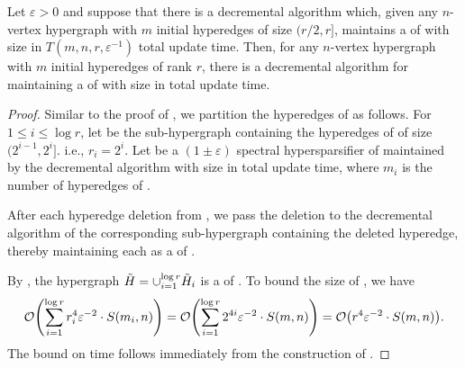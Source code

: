 \begin{lemma} \label{lem:r/2_dynamic}
Let \( \varepsilon > 0 \) and
suppose that there is a decremental algorithm which, given any \( n \)-vertex hypergraph  with \( m \) initial hyperedges of size \( (r/2, r ] \), maintains a \SpectralHypersparsifier{} of  with size  in \( T(m, n, r, \varepsilon ^{-1}) \) total update time.
Then, for any \( n \)-vertex hypergraph  with \( m \) initial hyperedges of rank \( r \), there is a decremental algorithm for maintaining a \SpectralHypersparsifier{} of  with size  in  total update time.
\end{lemma}
\begin{proof}
Similar to the proof of , we partition the hyperedges of  as follows.
For \( 1 \leq i \leq \log r \), let  be the sub-hypergraph containing the hyperedges of  of size \( (2^{i - 1} , 2^i] \).
i.e., \( r_i =  2^i\).
Let 
 be a \( (1 \pm \varepsilon ) \) spectral hypersparsifier of  maintained by the decremental algorithm with size  in  total update time, where \( m_i \) is the number of hyperedges of .

After each hyperedge deletion from , we pass the deletion to the decremental algorithm of the corresponding sub-hypergraph containing the deleted hyperedge, thereby maintaining each  as a \SpectralHypersparsifier{} of .

By , the hypergraph \( {  \tilde H = \cup _{i = 1} ^{\log r}} { \tilde H_i} \) is a \SpectralHypersparsifier{} of .
To bound the size of , we have
\begin{equation*}
\atmost{  \sum_{i = 1} ^ {\log r} r _i ^{\ConstantR} \varepsilon ^{ - \ConstantVar } \cdot S(m_i, n) } 
= 
\atmost{  \sum_{i = 1} ^ {\log r} 2 ^{\ConstantR i} \varepsilon ^{ - \ConstantVar } 
 \cdot S(m, n)  }
= 
\atmost{ r^{\ConstantR} \varepsilon^{ - \ConstantVar } \cdot S(m, n) }.
\end{equation*}
The bound on time follows immediately from the construction of .
\end{proof}

